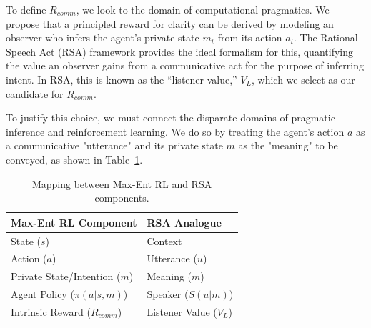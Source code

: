 \documentclass{article}
\begin{document}
To define $R_{comm}$, we look to the domain of computational pragmatics. We propose that a principled reward for clarity can be derived by modeling an observer who infers the agent's private state $m_t$ from its action $a_t$. The Rational Speech Act (RSA) framework provides the ideal formalism for this, quantifying the value an observer gains from a communicative act for the purpose of inferring intent. In RSA, this is known as the ``listener value,'' $V_L$, which we select as our candidate for $R_{comm}$.

To justify this choice, we must connect the disparate domains of pragmatic inference and reinforcement learning. We do so by treating the agent's action $a$ as a communicative "utterance" and its private state $m$ as the "meaning" to be conveyed, as shown in Table~\ref{tab:mapping}.

\begin{table}[h]
\centering
\caption{Mapping between Max-Ent RL and RSA components.}
\label{tab:mapping}
\begin{tabular}{|l|l|}
\hline
\textbf{Max-Ent RL Component} & \textbf{RSA Analogue} \\
\hline
State ($s$) & Context \\
Action ($a$) & Utterance ($u$) \\
Private State/Intention ($m$) & Meaning ($m$) \\
Agent Policy ($\pi(a|s,m)$) & Speaker ($S(u|m)$) \\
Intrinsic Reward ($R_{comm}$) & Listener Value ($V_L$) \\
\hline
\end{tabular}
\end{table}
\end{document}
